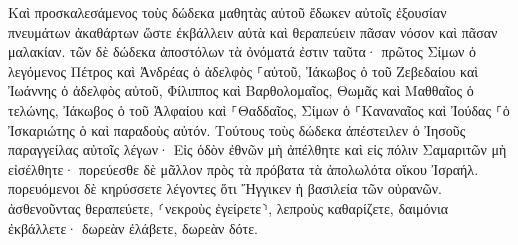 \documentclass{openreader}
\begin{document}
Καὶ προσκαλεσάμενος τοὺς δώδεκα μαθητὰς αὐτοῦ ἔδωκεν αὐτοῖς ἐξουσίαν πνευμάτων ἀκαθάρτων ὥστε ἐκβάλλειν αὐτὰ καὶ θεραπεύειν πᾶσαν νόσον καὶ πᾶσαν μαλακίαν. 
τῶν δὲ δώδεκα ἀποστόλων τὰ ὀνόματά ἐστιν ταῦτα· πρῶτος Σίμων ὁ λεγόμενος Πέτρος καὶ Ἀνδρέας ὁ ἀδελφὸς ⸀αὐτοῦ, Ἰάκωβος ὁ τοῦ Ζεβεδαίου καὶ Ἰωάννης ὁ ἀδελφὸς αὐτοῦ, 
Φίλιππος καὶ Βαρθολομαῖος, Θωμᾶς καὶ Μαθθαῖος ὁ τελώνης, Ἰάκωβος ὁ τοῦ Ἁλφαίου καὶ ⸀Θαδδαῖος, 
Σίμων ὁ ⸀Καναναῖος καὶ Ἰούδας ⸀ὁ Ἰσκαριώτης ὁ καὶ παραδοὺς αὐτόν. 
Τούτους τοὺς δώδεκα ἀπέστειλεν ὁ Ἰησοῦς παραγγείλας αὐτοῖς λέγων· Εἰς ὁδὸν ἐθνῶν μὴ ἀπέλθητε καὶ εἰς πόλιν Σαμαριτῶν μὴ εἰσέλθητε· 
πορεύεσθε δὲ μᾶλλον πρὸς τὰ πρόβατα τὰ ἀπολωλότα οἴκου Ἰσραήλ. 
πορευόμενοι δὲ κηρύσσετε λέγοντες ὅτι Ἤγγικεν ἡ βασιλεία τῶν οὐρανῶν. 
ἀσθενοῦντας θεραπεύετε, ⸂νεκροὺς ἐγείρετε⸃, λεπροὺς καθαρίζετε, δαιμόνια ἐκβάλλετε· δωρεὰν ἐλάβετε, δωρεὰν δότε. 
\end{document}
